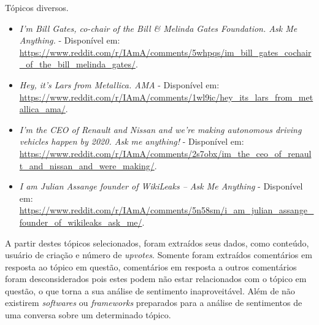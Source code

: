 Tópicos diversos.
\begin{itemize}
  \item
  \textit{I’m Bill Gates, co-chair of the Bill \& Melinda Gates Foundation. Ask
  Me Anything.} - Disponível em: \url{https://www.reddit.com/r/IAmA/comments/5whpqs/im_bill_gates_cochair_of_the_bill_melinda_gates/}.
  \item
  \textit{Hey, it's Lars from Metallica. AMA} - Disponível em: \url{https://www.reddit.com/r/IAmA/comments/1wl9ic/hey_its_lars_from_metallica_ama/}.
  
  \item
  \textit{I'm the CEO of Renault and Nissan and we're making autonomous driving vehicles happen by 2020. Ask me anything!} - Disponível em: \url{https://www.reddit.com/r/IAmA/comments/2s7obx/im_the_ceo_of_renault_and_nissan_and_were_making/}.
  
  \item
  \textit{I am Julian Assange founder of WikiLeaks -- Ask Me Anything} - Disponível em: \url{https://www.reddit.com/r/IAmA/comments/5n58sm/i_am_julian_assange_founder_of_wikileaks_ask_me/}.
  
\end{itemize}


A partir destes tópicos selecionados, foram extraídos seus dados, como conteúdo,
usuário de criação e número de \textit{upvotes}. Somente foram extraídos
comentários em resposta ao tópico em questão, comentários em resposta a outros
comentários foram desconsiderados pois estes podem não estar relacionados com o
tópico em questão, o que torna a sua análise de sentimento inaproveitável. Além
de não existirem \textit{softwares} ou \textit{frameworks} preparados para a
análise de sentimentos de uma conversa sobre um determinado tópico.

